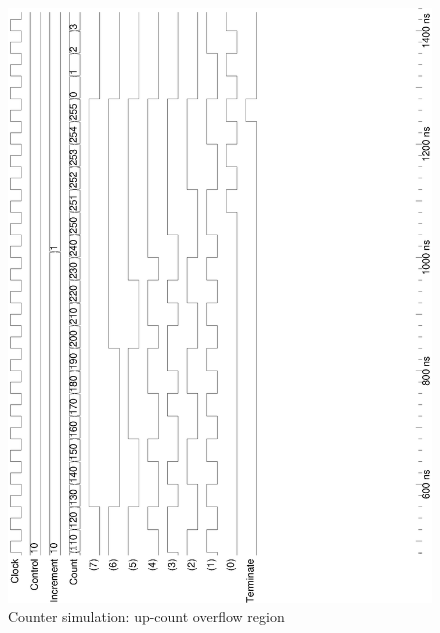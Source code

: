 \documentclass[10pt,a4paper]{report}
\begin{document}
\begin{figure}
\center
\includegraphics[scale=0.49,angle=-90]{graphs/counter_8bit_test1.ps}
\caption{\small{Counter simulation: up-count overflow region}} \label{wave:c8:w1}


\end{figure}
\end{document}
